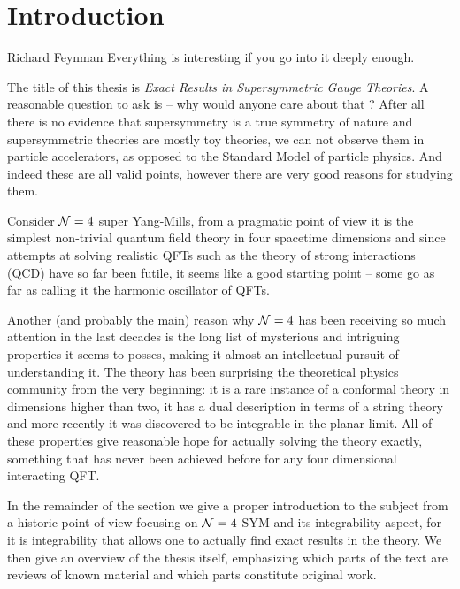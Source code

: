 
\section{Introduction}

\begin{chapquote}{Richard Feynman}
Everything is interesting if you go into it deeply enough.
\end{chapquote}

\noindent The title of this thesis is \emph{Exact Results in Supersymmetric Gauge Theories}. A reasonable question to ask is -- why would anyone care about that ? 
After all there is no evidence that supersymmetry is a true symmetry of nature and supersymmetric theories are mostly toy theories, we can not observe them in particle accelerators, as opposed to the Standard Model of particle physics. 
And indeed these are all valid points, however there are very good reasons for studying them. 

Consider $\mathcal{N}=4$ super Yang-Mills, from a pragmatic point of view it is the simplest non-trivial quantum field theory in four spacetime dimensions and since attempts at solving realistic QFTs such as the theory of strong interactions (QCD) have so far been futile, it seems like a good starting point -- some go as far as calling it the harmonic oscillator of QFTs. 

Another (and probably the main) reason why $\mathcal{N}=4$ has been receiving so much attention in the last decades is the long list of mysterious and intriguing properties it seems to posses, making it almost an intellectual pursuit of understanding it. 
The theory has been surprising the theoretical physics community from the very beginning: it is a rare instance of a conformal theory in dimensions higher than two, it has a dual description in terms of a string theory and more recently it was discovered to be integrable in the planar limit. 
All of these properties give reasonable hope for actually solving the theory exactly, something that has never been achieved before for any four dimensional interacting QFT.

In the remainder of the section we give a proper introduction to the subject from a historic point of view focusing on $\mathcal{N}=4$ SYM and its integrability aspect, for it is integrability that allows one to actually find exact results in the theory. We then give an overview of the thesis itself, emphasizing which parts of the text are reviews of known material and which parts constitute original work.

